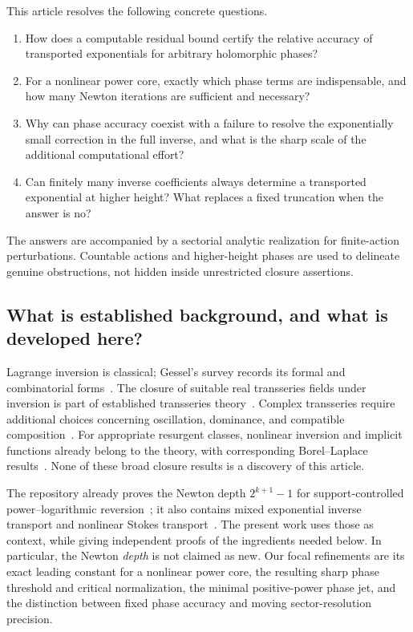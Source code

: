 \documentclass[11pt,a4paper]{article}
\theoremstyle{definition}
\theoremstyle{remark}
\numberwithin{equation}{section}
\begin{document}
This article resolves the following concrete questions.
\begin{enumerate}[label=\textbf{Q\arabic*.},leftmargin=12mm]
\item How does a computable residual bound certify the relative accuracy of transported exponentials for arbitrary holomorphic phases?
\item For a nonlinear power core, exactly which phase terms are indispensable, and how many Newton iterations are sufficient and necessary?
\item Why can phase accuracy coexist with a failure to resolve the exponentially small correction in the full inverse, and what is the sharp scale of the additional computational effort?
\item Can finitely many inverse coefficients always determine a transported exponential at higher height? What replaces a fixed truncation when the answer is no?
\end{enumerate}
The answers are accompanied by a sectorial analytic realization for finite-action perturbations. Countable actions and higher-height phases are used to delineate genuine obstructions, not hidden inside unrestricted closure assertions.

\subsection{What is established background, and what is developed here?}

Lagrange inversion is classical; Gessel's survey records its formal and combinatorial forms~\cite{Gessel}. The closure of suitable real transseries fields under inversion is part of established transseries theory~\cite{vdHBook}. Complex transseries require additional choices concerning oscillation, dominance, and compatible composition~\cite{vdHComplex}. For appropriate resurgent classes, nonlinear inversion and implicit functions already belong to the theory, with corresponding Borel--Laplace results~\cite{SauzinNonlinear,SauzinIntro}. None of these broad closure results is a discovery of this article.

The repository already proves the Newton depth $2^{k+1}-1$ for support-controlled power--logarithmic reversion~\cite{RepoSupport}; it also contains mixed exponential inverse transport and nonlinear Stokes transport~\cite{RepoStokes}. The present work uses those as context, while giving independent proofs of the ingredients needed below. In particular, the Newton \emph{depth} is not claimed as new. Our focal refinements are its exact leading constant for a nonlinear power core, the resulting sharp phase threshold and critical normalization, the minimal positive-power phase jet, and the distinction between fixed phase accuracy and moving sector-resolution precision.
\end{document}
